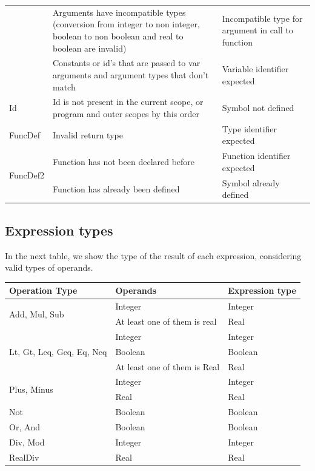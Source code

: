 \documentclass[12pt]{article}
\begin{document}
\begin{longtable} {|p{3.0cm} | p{8cm} | p{4.0cm}|}
	 					& Arguments have incompatible types (conversion from integer to non integer, boolean to non boolean and real to boolean are invalid) & Incompatible type for argument in call to function  \\ \cline{2-3}
						& Constants or id's that are passed to var arguments and argument types that don't match & Variable identifier expected  \\ \hline
	Id 					& Id is not present in the current scope, or program and outer scopes by this order & Symbol not defined  \\ \hline
	FuncDef			& Invalid return type & Type identifier expected \\ \hline
	\multirow{2}{*}{FuncDef2} & Function has not been declared before & Function identifier expected \\ \cline{2-3}
					& Function has already been defined & Symbol already defined \\ \hline

\end{longtable}

\newpage

\subsection{Expression types}

In the next table, we show the type of the result of each expression, considering valid types of operands. \\

\begin{tabularx} {\textwidth} {|X|X|X|} 
 \textbf{Operation Type} 	& \textbf{Operands} & \textbf{Expression type} \\ \hline
	\multirow{2}{*}{Add, Mul, Sub} 	& Integer & Integer \\ \cline{2-3}
									& At least one of them is real & Real \\ \hline
	\multirow{3}{*}{Lt, Gt, Leq, Geq, Eq, Neq} 	& Integer & Integer \\ \cline{2-3}
												& Boolean & Boolean \\ \cline{2-3}
												& At least one of them is Real & Real \\ \hline
	\multirow{2}{*}{Plus, Minus} 				& Integer & Integer \\ \cline{2-3}
												& Real & Real \\ \hline
	Not & Boolean & Boolean \\ \hline
	Or, And & Boolean & Boolean \\ \hline
	Div, Mod & Integer & Integer \\ \hline
	RealDiv & Real & Real \\ \hline
	

\end{tabularx}
\end{document}
